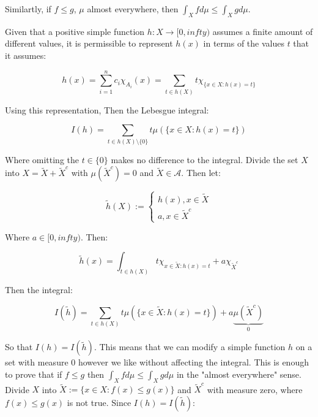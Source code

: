 Similartly, if $f\leq g$,  $\mu$ almost everywhere, then $\int_X f d\mu \leq \int_X g d\mu$.


Given that a positive simple function $h:X \rightarrow [0,infty)$ assumes a finite amount of different values, it is permissible to represent $h(x)$ in terms of the values $t$ that it assumes:

\begin{equation}
h(x) = \sum_{i=1}^n c_i \chi_{A_i} (x) = \sum_{t\in h(X)} t \chi_{\{x\in X: h(x) = t\}}
\end{equation} 

Using this representation, Then the Lebesgue integral:

\begin{equation}
I(h) = \sum_{t\in h(X)\setminus \{0\}} t \mu (\{ x\in X : h(x) = t \} ) 
\end{equation}

Where omitting the $t\in\{0\}$ makes no difference to the integral. Divide the set $X$ into $X = \tilde{X} + \tilde{X}^c$ with $\mu(\tilde{X}^c) = 0 $ and $\tilde{X} \in \mathscr{A}$. Then let:

\begin{equation}
\tilde{h}(X) := \left\{ \begin{array}{l} h(x), x\in \tilde{X}\\ a, x\in \tilde{X}^c \end{array} \right.
\end{equation}

Where $a \in [0, infty)$.  Then:

\begin{equation}
\tilde{h}(x) = \int_{t\in h(X)} t \chi_{x\in \tilde{X}: h(x) = t} + a \chi_{\tilde{X}^c}
\end{equation}

Then the integral:

\begin{equation}
I (\tilde{h}) = \sum_{t\in h(X)} t \mu( \{ x\in \tilde{X} : h(x) = t \}) + a \underbrace{\mu(\tilde{X}^c)}_{0}
\end{equation}

So that $I(h) = I(\tilde{h})$. This means that we can modify a simple function $h$ on a set with measure $0$ however we like without affecting the integral. This is enough to prove that if $f\leq g$ then $\int_X f d\mu \leq \int_X g d\mu$ in the "almost everywhere" sense. Divide $X$ into $\tilde{X}:= \{x \in X: f(x) \leq g(x) \}$ and $\tilde{X}^c$ with measure zero, where $f(x) \leq g(x)$ is not true. Since $I(h) = I(\tilde{h})$:

